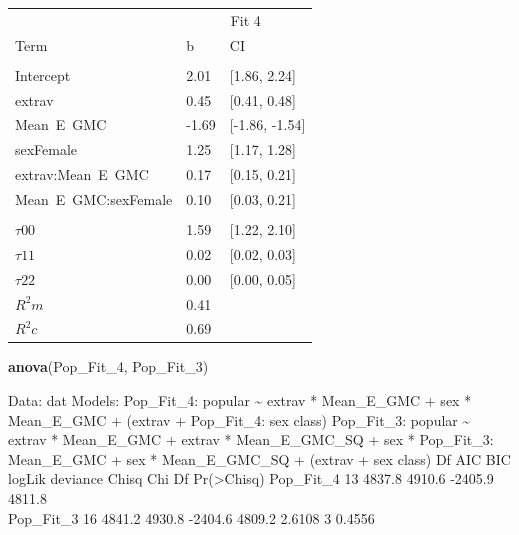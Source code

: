 \documentclass[]{article}
\newenvironment{Shaded}{\begin{snugshade}}{\end{snugshade}}
\newcommand{\KeywordTok}[1]{\textcolor[rgb]{0.13,0.29,0.53}{\textbf{#1}}}
\newcommand{\DecValTok}[1]{\textcolor[rgb]{0.00,0.00,0.81}{#1}}
\newcommand{\NormalTok}[1]{#1}
\begin{document}
\begin{tabular}{lll}
\toprule
\multicolumn{1}{c}{ } & \multicolumn{2}{c}{Fit 4} \\
\cmidrule(l{2pt}r{2pt}){2-3}
Term & b & CI\\
\midrule
\addlinespace[0.3em]
\multicolumn{3}{l}{\textbf{Fixed}}\\
\hspace{1em}Intercept & 2.01 & [1.86, 2.24]\\
\hspace{1em}extrav & 0.45 & [0.41, 0.48]\\
\hspace{1em}Mean\ E\ GMC & -1.69 & [-1.86, -1.54]\\
\hspace{1em}sexFemale & 1.25 & [1.17, 1.28]\\
\hspace{1em}extrav:Mean\ E\ GMC & 0.17 & [0.15, 0.21]\\
\hspace{1em}Mean\ E\ GMC:sexFemale & 0.10 & [0.03, 0.21]\\
\addlinespace[0.3em]
\multicolumn{3}{l}{\textbf{Random}}\\
\hspace{1em}$\tau {00}$ & 1.59 & [1.22, 2.10]\\
\hspace{1em}$\tau {11}$ & 0.02 & [0.02, 0.03]\\
\hspace{1em}$\tau {22}$ & 0.00 & [0.00, 0.05]\\
$R^2 m$ & 0.41 & \\
$R^2 c$ & 0.69 & \\
\bottomrule
\end{tabular}

\begin{Shaded}
\begin{Highlighting}[]
\KeywordTok{anova}\NormalTok{(Pop_Fit_}\DecValTok{4}\NormalTok{, Pop_Fit_}\DecValTok{3}\NormalTok{)}
\end{Highlighting}
\end{Shaded}

Data: dat Models: Pop\_Fit\_4: popular \textasciitilde{} extrav *
Mean\_E\_GMC + sex * Mean\_E\_GMC + (extrav + Pop\_Fit\_4: sex
\textbar{} class) Pop\_Fit\_3: popular \textasciitilde{} extrav *
Mean\_E\_GMC + extrav * Mean\_E\_GMC\_SQ + sex * Pop\_Fit\_3:
Mean\_E\_GMC + sex * Mean\_E\_GMC\_SQ + (extrav + sex \textbar{} class)
Df AIC BIC logLik deviance Chisq Chi Df Pr(\textgreater{}Chisq)
Pop\_Fit\_4 13 4837.8 4910.6 -2405.9 4811.8\\
Pop\_Fit\_3 16 4841.2 4930.8 -2404.6 4809.2 2.6108 3 0.4556
\end{document}

